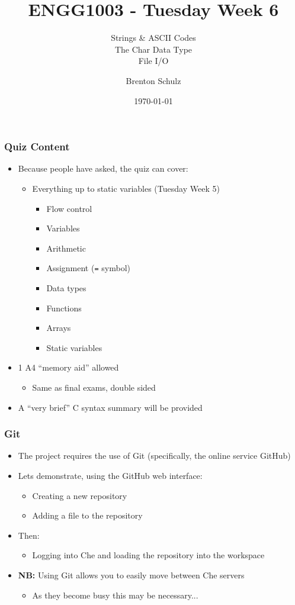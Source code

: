 \documentclass[14pt]{beamer}
\title{ENGG1003 - Tuesday Week 6}
\subtitle{Strings \& ASCII Codes\\The Char Data Type\\File I/O}
\author{Brenton Schulz}
\institute{University of Newcastle}
\date{\today}
\begin{document}
\titlepage

\begin{frame}
\frametitle{Quiz Content}
\begin{itemize}
\item Because people have asked, the quiz can cover:
\vspace{-4mm}
	\begin{itemize}
		\item Everything up to static variables (Tuesday Week 5)
		\vspace{-4mm}
			\begin{itemize}
				\item Flow control
				\item Variables
				\item Arithmetic
				\item Assignment (\texttt{=} symbol)
				\item Data types
				\item Functions
				\item Arrays
				\item Static variables
			\end{itemize}
	\end{itemize}
\item 1 A4 ``memory aid'' allowed
	\begin{itemize}
		\item Same as final exams, double sided
	\end{itemize}	
\item A ``very brief'' C syntax summary will be provided
\end{itemize}
\end{frame}

\begin{frame}
\frametitle{Git}
\begin{itemize}
\item The project requires the use of Git (specifically, the online service GitHub)
\item Lets demonstrate, using the GitHub web interface:
	\begin{itemize}
		\item Creating a new repository
		\item Adding a file to the repository
	\end{itemize}
\item Then:
	\begin{itemize}
		\item Logging into Che and loading the repository into the workspace
	\end{itemize}
\item \textbf{NB:} Using Git allows you to easily move between Che servers
	\begin{itemize}
		\item As they become busy this may be necessary...
	\end{itemize}
\end{itemize}
\end{frame}
\end{document}

